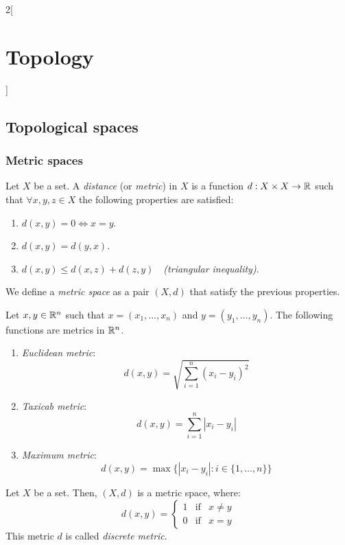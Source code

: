 \documentclass[../../../main.tex]{subfiles}
\begin{document}
\begin{multicols}{2}[\section{Topology}]
  \subsection{Topological spaces}
  \subsubsection{Metric spaces}
  \begin{definition}
    Let $X$ be a set. A \textit{distance} (or \textit{metric}) in $X$ is a function $d:X\times X\rightarrow\mathbb{R} $ such that $\forall x,y,z\in X$ the following properties are satisfied:
    \begin{enumerate}
      \item $d(x,y)=0\iff x=y$.
      \item $d(x,y)=d(y,x)$.
      \item $d(x,y)\leq d(x,z)+d(z,y)\quad$\textit{(triangular inequality)}.
    \end{enumerate}
    We define a \textit{metric space} as a pair $(X,d)$ that satisfy the previous properties.
  \end{definition}
  \begin{prop}
    Let $x,y\in\mathbb{R}^n$ such that $x=(x_1,\ldots,x_n)$ and $y=(y_1,\ldots,y_n)$. The following functions are metrics in $\mathbb{R}^n$.
    \begin{enumerate}
      \item \textit{Euclidean metric}: $$d(x,y)=\sqrt{\sum_{i=1}^n{(x_i-y_i)}^2}$$
      \item \textit{Taxicab metric}: $$d(x,y)=\sum_{i=1}^n|x_i-y_i|$$
      \item \textit{Maximum metric}: $$d(x,y)=\max\{|x_i-y_i|:i\in\{1,\ldots,n\}\}$$
    \end{enumerate}
  \end{prop}
  \begin{prop}
    Let $X$ be a set. Then, $(X,d)$ is a metric space, where: $$d(x,y)=
      \left\{\begin{array}{lcc}
        1 & \text{if} & x\ne y \\
        0 & \text{if} & x= y
      \end{array}\right.
    $$
    This metric $d$ is called \textit{discrete metric}.
  \end{prop}

\end{multicols}
\end{document}
